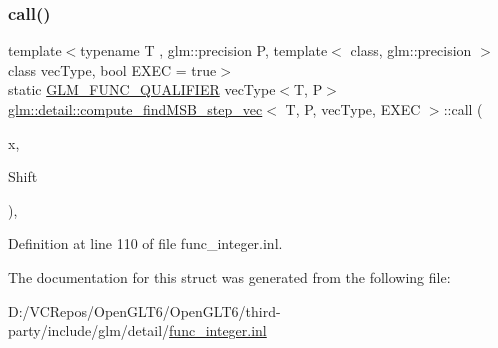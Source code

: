 \subsubsection{\texorpdfstring{call()}{call()}}
{\footnotesize\ttfamily template$<$typename T , glm\+::precision P, template$<$ class, glm\+::precision $>$ class vec\+Type, bool E\+X\+EC = true$>$ \\
static \mbox{\hyperlink{setup_8hpp_a33fdea6f91c5f834105f7415e2a64407}{G\+L\+M\+\_\+\+F\+U\+N\+C\+\_\+\+Q\+U\+A\+L\+I\+F\+I\+ER}} vec\+Type$<$T, P$>$ \mbox{\hyperlink{structglm_1_1detail_1_1compute__find_m_s_b__step__vec}{glm\+::detail\+::compute\+\_\+find\+M\+S\+B\+\_\+step\+\_\+vec}}$<$ T, P, vec\+Type, E\+X\+EC $>$\+::call (\begin{DoxyParamCaption}\item[{vec\+Type$<$ T, P $>$ const \&}]{x,  }\item[{T}]{Shift }\end{DoxyParamCaption})\hspace{0.3cm}{\ttfamily [inline]}, {\ttfamily [static]}}



Definition at line 110 of file func\+\_\+integer.\+inl.



The documentation for this struct was generated from the following file\+:\begin{DoxyCompactItemize}
\item 
D\+:/\+V\+C\+Repos/\+Open\+G\+L\+T6/\+Open\+G\+L\+T6/third-\/party/include/glm/detail/\mbox{\hyperlink{func__integer_8inl}{func\+\_\+integer.\+inl}}\end{DoxyCompactItemize}
